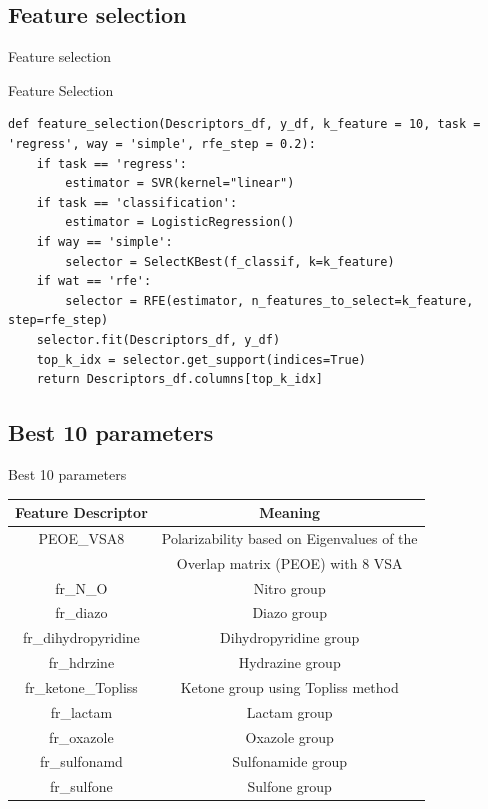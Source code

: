 \documentclass{beamer}
\begin{document}
\subsection{Feature selection}
\begin{frame}[fragile]{Feature selection}

\begin{block}{Feature Selection}
\begin{lstlisting}[firstnumber=1, label=glabels, xleftmargin=10pt] 
def feature_selection(Descriptors_df, y_df, k_feature = 10, task = 'regress', way = 'simple', rfe_step = 0.2):
    if task == 'regress':
        estimator = SVR(kernel="linear")
    if task == 'classification':
        estimator = LogisticRegression()
    if way == 'simple':
        selector = SelectKBest(f_classif, k=k_feature)
    if wat == 'rfe':
        selector = RFE(estimator, n_features_to_select=k_feature, step=rfe_step)
    selector.fit(Descriptors_df, y_df)
    top_k_idx = selector.get_support(indices=True)
    return Descriptors_df.columns[top_k_idx]

\end{lstlisting}
\end{block}
    
\end{frame}
    

\subsection{Best 10 parameters}
\begin{frame}[fragile]{Best 10 parameters}

\setlength{\topsep}{3mm}
\begin{tabular}{|c|c|}
\hline
\textbf{Feature Descriptor} & \textbf{Meaning} \\ 
\hline

PEOE\_VSA8 & Polarizability based on Eigenvalues of the \\ & Overlap matrix (PEOE) with 8 VSA \\ 
\hline
fr\_N\_O & Nitro group \\ 
\hline
fr\_diazo & Diazo group \\ 
\hline
fr\_dihydropyridine & Dihydropyridine group \\ 
\hline
fr\_hdrzine & Hydrazine group \\ 
\hline
fr\_ketone\_Topliss & Ketone group using Topliss method \\ 
\hline
fr\_lactam & Lactam group \\ 
\hline
fr\_oxazole & Oxazole group \\ 
\hline
fr\_sulfonamd & Sulfonamide group \\ 
\hline
fr\_sulfone & Sulfone group \\ 
\hline
\end{tabular}
    
\end{frame}
    
\end{document}
